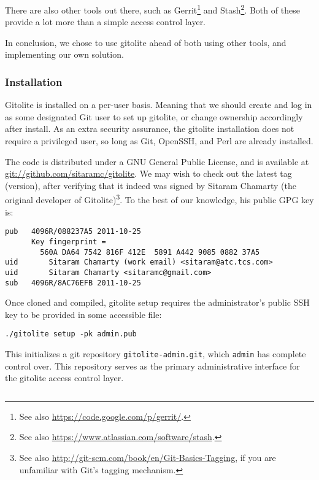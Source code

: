 There are also other tools out there, such as  Gerrit\footnote{See also
\url{https://code.google.com/p/gerrit/}.} and Stash\footnote{See also
\url{https://www.atlassian.com/software/stash}.}. Both of these provide a lot
more than a simple access control layer.

In conclusion, we chose to use gitolite ahead of both using other tools, and
implementing our own solution.

\subsubsection{Installation}

Gitolite is installed on a per-user basis. Meaning that we should create and
log in as some designated Git user to set up gitolite, or change ownership
accordingly after install. As an extra security assurance, the gitolite
installation does not require a privileged user, so long as Git, OpenSSH, and
Perl are already installed.

The code is distributed under a GNU General Public License, and is available at
\url{git://github.com/sitaramc/gitolite}. We may wish to check out the latest
tag (version), after verifying that it indeed was signed by Sitaram Chamarty
(the original developer of Gitolite)\footnote{See also
\url{http://git-scm.com/book/en/Git-Basics-Tagging}, if you are unfamiliar with
Git's tagging mechanism.}. To the best of our knowledge, his public GPG key is:

\begin{lstlisting}
pub   4096R/088237A5 2011-10-25
      Key fingerprint =
        560A DA64 7542 816F 412E  5891 A442 9085 0882 37A5
uid       Sitaram Chamarty (work email) <sitaram@atc.tcs.com>
uid       Sitaram Chamarty <sitaramc@gmail.com>
sub   4096R/8AC76EFB 2011-10-25
\end{lstlisting}

Once cloned and compiled, gitolite setup requires the administrator's public
SSH key to be provided in some accessible file:

\begin{lstlisting}
./gitolite setup -pk admin.pub
\end{lstlisting}

This initializes a git repository \texttt{gitolite-admin.git}, which
\texttt{admin} has complete control over. This repository serves as the primary
administrative interface for the gitolite access control layer.

\begin{lstlisting}

\end{lstlisting}

